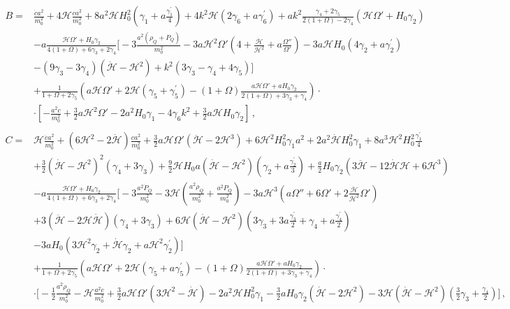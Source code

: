 \documentclass[prd,nofootinbib,showpacs]{revtex4}
\def\l{\left}
\def\r{\right}
\def\f{\frac}
\def\hub{{\mathcal H}}
\begin{document}
{\begin{align}
%
B =& \f{\dot{c}a^2}{m_0^2} +4\hub \f{c a^2}{m_0^2} +8 a^2\hub H_0^2\l(\gamma_1 +a\f{\gamma_1^\prime}{4}\r) +4k^2\hub\l(2\gamma_6 +a\gamma_6^\prime \r) + ak^2 \f{\gamma_4+2\gamma_5}{2(1+\Omega) -2\gamma_4}\l(\hub\Omega' +H_0\gamma_2\r) \nonumber\\
& -a\f{\hub \Omega' + H_0\gamma_2}{4(1+\Omega)+6\gamma_3 +2\gamma_4}\bigg[ -3\f{a^2(\rho_{Q}+P_Q)}{m_0^2} -3a\hub^2\Omega'\l( 4+ \f{\dot{\hub}}{\hub^2} +a\f{\Omega''}{\Omega'}\r) -3a\hub H_0 \l(4\gamma_2+a\gamma_2^\prime\r) \nonumber\\
& -\l(9 \gamma_3-3\gamma_4 \r)\l(\dot{\hub} -\hub^2\r) +k^2\l(3\gamma_3-\gamma_4 +4\gamma_5 \r)\bigg]  \nonumber \\
& +\f{1}{1+\Omega+2\gamma_5}\l( a\hub\Omega' +2\hub\l(\gamma_5+\gamma_5^\prime\r) -(1+\Omega)\f{a\hub\Omega' +aH_0\gamma_2}{2(1+\Omega) +3\gamma_3+\gamma_4}\r)\cdot \nonumber\\
&\cdot\l[-\f{a^2c}{m_0^2}+\f{3}{2}a\hub^2\Omega'-2a^2H_0\gamma_1-4\gamma_6k^2 +\f{3}{2}a\hub H_0\gamma_2 \r] \, , \\
%
& \nonumber \\
%
C =&  \hub\f{\dot{c}a^2}{m_0^2} +\l(6\hub^2-2\dot{\hub}\r)\f{ca^2}{m_0^2}  +\f{3}{2}a\hub\Omega'\l(\ddot{\hub} -2\hub^3\r) +6\hub^2H_0 ^2\gamma_1a^2 + 2a^2\dot{\hub} H_0^2\gamma_1 +8a^3\hub^2 H_0^2\f{\gamma_1^\prime}{4} \nonumber\\
& +\f{3}{2}\l(\dot{\hub} -\hub^2\r)^2\l(\gamma_4 +3\gamma_3\r) +\f{9}{2}\hub H_0 a\l(\dot{\hub}-\hub^2\r)\l(\gamma_2+a\f{\gamma_2^\prime}{3}\r) +\f{a}{2}H_0\gamma_2\l(3\ddot{\hub}-12\dot{\hub}\hub +6\hub^3\r) \nonumber \\
& -a\f{\hub \Omega' + H_0\gamma_2}{4(1+\Omega)+6\gamma_3+2\gamma_4}\bigg[ -3\f{a^2\dot{P}_Q}{m_0^2}-3\hub \l(\f{a^2\rho_Q}{m_0^2} +\f{a^2 P_Q}{m_0^2}\r) -3a\hub^3\l(a\Omega'' +6\Omega' +2\f{\dot{\hub}}{\hub^2}\Omega' \r) \nonumber\\
& +3\l(\ddot{\hub}-2\hub \dot{\hub}\r)\l(\gamma_4 +3\gamma_3\r) +6\hub\l(\dot{\hub}-\hub^2\r)\l(3\gamma_3+3a\f{\gamma_3^\prime}{2} +\gamma_4+a\f{\gamma_4^\prime}{2}\r) \nonumber \\
& -3a H_0\l(3\hub^2\gamma_2+\dot{\hub}\gamma_2 +a\hub^2\gamma_2^\prime\r) \bigg] \nonumber \\
& +\f{1}{1+\Omega+2\gamma_5}\l( a\hub\Omega' +2\hub\l(\gamma_5+a\gamma_5^\prime\r) -(1+\Omega)\f{a\hub\Omega' +aH_0\gamma_2}{2(1+\Omega) +3\gamma_3+\gamma_4}\r)\cdot \nonumber\\
&\cdot\bigg[ -\f{1}{2}\f{a^2\dot{\rho}_Q}{m_0^2} -\hub\f{a^2c}{m_0^2} +\f{3}{2}a\hub\Omega'\l(3\hub^2 -\dot{\hub}\r) -2a^2\hub H_0^2\gamma_1 -\f{3}{2}aH_0\gamma_2\l(\dot{\hub}-2\hub^2\r) -3\hub\l(\dot{\hub}-\hub^2\r)\l(\f{3}{2}\gamma_3 + \f{\gamma_4}{2}\r)\bigg] \, ,\nonumber\\

\end{align}}
\end{document}
